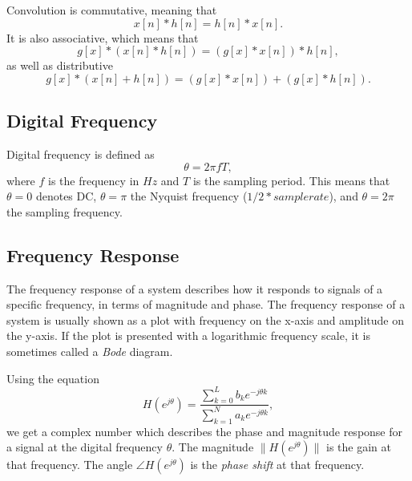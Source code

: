 \documentclass{article}
\def\lsqb{\left[}
\def\rsqb{\right]}
\def\sqb#1{\lsqb #1 \rsqb}
\def\xsig{x\sqb{n}}
\begin{document}
Convolution is commutative, meaning that
\begin{equation}
    \xsig * h\sqb{n} = h\sqb{n} * \xsig.
\end{equation}
It is also associative, which means that
\begin{equation}
    g\sqb{x} * (\xsig * h\sqb{n}) = (g\sqb{x} * \xsig) * h\sqb{n},
\end{equation}
as well as distributive
\begin{equation}
    g\sqb{x} * (\xsig + h\sqb{n}) = (g\sqb{x} * \xsig) + (g\sqb{x} *  h\sqb{n}).
\end{equation}

\subsection{Digital Frequency}
Digital frequency is defined as
\begin{equation}
    \theta = 2\pi f T,
\end{equation}
where $f$ is the frequency in $Hz$ and $T$ is the sampling period. This means that $\theta=0$ denotes DC, $\theta=\pi$ the Nyquist frequency ($1/2 * samplerate$), and $\theta=2\pi$ the sampling frequency.

\subsection{Frequency Response}
The frequency response of a system describes how it responds to signals of a specific frequency, in terms of magnitude and phase. The frequency response of a system is usually shown as a plot with frequency on the x-axis and amplitude on the y-axis. If the plot is presented with a logarithmic frequency scale, it is sometimes called a \textit{Bode} diagram.

Using the equation
\def\hfun{H(e^{j\theta})}
\begin{equation}
    \hfun = \frac{\sum_{k=0}^{L} b_k e^{-j\theta k}}{\sum_{k=1}^{N} a_k e^{-j\theta k}},
\end{equation}
we get a complex number which describes the phase and magnitude response for a signal at the digital frequency $\theta$. The magnitude $\|\hfun\|$ is the gain at that frequency. The angle $\angle \hfun$ is the \textit{phase shift} at that frequency.
\end{document}
